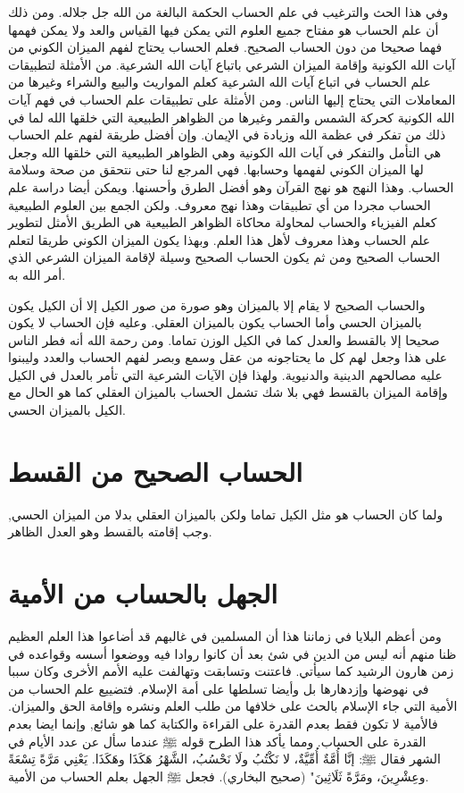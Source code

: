 وفي هذا الحث والترغيب في علم الحساب الحكمة البالغة من الله جل جلاله. ومن ذلك أن علم الحساب هو مفتاح جميع العلوم التي يمكن فيها القياس والعد ولا يمكن فهمها فهما صحيحا من دون الحساب الصحيح. فعلم الحساب يحتاج لفهم الميزان الكوني من آيات الله الكونية وإقامة الميزان الشرعي باتباع آيات الله الشرعية. من الأمثلة لتطبيقات علم الحساب في اتباع آيات الله الشرعية كعلم المواريث والبيع والشراء وغيرها من المعاملات التي يحتاج إليها الناس.  ومن الأمثلة على تطبيقات علم الحساب في فهم آيات الله الكونية كحركة الشمس والقمر وغيرها من الظواهر الطبيعية التي خلقها الله لما في ذلك من تفكر في عظمة الله وزيادة في الإيمان. وإن أفضل طريقة لفهم علم الحساب هي التأمل والتفكر في آيات الله الكونية وهي الظواهر الطبيعية التي خلقها الله وجعل لها الميزان الكوني لفهمها وحسابها. فهي المرجع لنا حتى نتحقق من صحة وسلامة الحساب. وهذا النهج هو نهج القرآن وهو أفضل الطرق وأحسنها. ويمكن أيضا دراسة علم الحساب مجردا من أي تطبيقات وهذا نهج معروف. ولكن الجمع بين العلوم الطبيعية كعلم الفيزياء والحساب لمحاولة محاكاة الظواهر الطبيعية هي الطريق الأمثل لتطوير علم الحساب وهذا معروف لأهل هذا العلم. وبهذا يكون الميزان الكوني طريقا لتعلم الحساب الصحيح ومن ثم يكون الحساب الصحيح وسيلة لإقامة الميزان الشرعي الذي أمر الله به.

والحساب الصحيح لا يقام إلا بالميزان وهو صورة من صور الكيل إلا أن الكيل يكون بالميزان الحسي وأما الحساب يكون بالميزان العقلي. وعليه فإن الحساب لا يكون صحيحا إلا بالقسط والعدل كما في الكيل الوزن تماما. ومن رحمة الله أنه فطر الناس على هذا وجعل لهم كل ما يحتاجونه من عقل وسمع وبصر لفهم الحساب والعدد وليبنوا عليه مصالحهم الدينية والدنيوية. ولهذا فإن الآيات الشرعية التي تأمر بالعدل في الكيل وإقامة الميزان بالقسط فهي بلا شك تشمل الحساب بالميزان العقلي كما هو الحال مع الكيل بالميزان الحسي.


\section{الحساب الصحيح من القسط}
ولما كان الحساب هو مثل الكيل تماما ولكن بالميزان العقلي بدلا من الميزان الحسي, وجب إقامته بالقسط وهو العدل الظاهر.

\section{الجهل بالحساب من الأمية}

ومن أعظم البلايا في زماننا هذا أن المسلمين في غالبهم قد أضاعوا هذا العلم العظيم ظنا منهم أنه ليس من الدين في شئ بعد أن كانوا روادا فيه ووضعوا أسسه وقواعده في زمن هارون الرشيد كما سيأتي. فاعتنت وتسابقت وتهالفت عليه الأمم الأخرى وكان سببا في نهوضها وإزدهارها بل وأيضا تسلطها على أمة الإسلام. فتضييع علم الحساب من الأمية التي جاء الإسلام بالحث على خلافها من طلب العلم ونشره وإقامة الحق والميزان. فالأمية لا تكون فقط بعدم القدرة على القراءة والكتابة كما هو شائع, وإنما ايضا بعدم القدرة على الحساب.
ومما يأكد هذا الطرح قوله ﷺ عندما سأل عن عدد الأيام في الشهر فقال ﷺ:
إنَّا أُمَّةٌ أُمِّيَّةٌ، لا نَكْتُبُ ولَا نَحْسُبُ، الشَّهْرُ هَكَذَا وهَكَذَا. يَعْنِي مَرَّةً تِسْعَةً وعِشْرِينَ، ومَرَّةً ثَلَاثِينَ"
{\footnotesize (صحيح البخاري)}.
فجعل ﷺ الجهل بعلم الحساب من الأمية.

